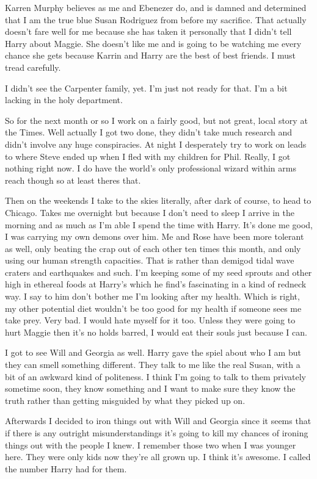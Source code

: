 Karren Murphy believes as me and Ebenezer do, and is damned and determined that I am the true blue Susan Rodriguez from before my sacrifice. That actually doesn't fare well for me because she has taken it personally that I didn't tell Harry about Maggie. She doesn't like me and is going to be watching me every chance she gets because Karrin and Harry are the best of best friends. I must tread carefully.

I didn't see the Carpenter family, yet. I'm just not ready for that. I'm a bit lacking in the holy department.

So for the next month or so I work on a fairly good, but not great, local story at the Times. Well actually I got two done, they didn't take much research and didn't involve any huge conspiracies. At night I desperately try to work on leads to where Steve ended up when I fled with my children for Phil. Really, I got nothing right now. I do have the world's only professional wizard within arms reach though so at least theres that.

Then on the weekends I take to the skies literally, after dark of course, to head to Chicago. Takes me overnight but because I don't need to sleep I arrive in the morning and as much as I'm able I spend the time with Harry. It's done me good, I was carrying my own demons over him. Me and Rose have been more tolerant as well, only beating the crap out of each other ten times this month, and only using our human strength capacities. That is rather than demigod tidal wave craters and earthquakes and such. I'm keeping some of my seed sprouts and other high in ethereal foods at Harry's which he find's fascinating in a kind of redneck way. I say to him don't bother me I'm looking after my health. Which is right, my other potential diet wouldn't be too good for my health if someone sees me take prey. Very bad. I would hate myself for it too. Unless they were going to hurt Maggie then it's no holds barred, I would eat their souls just because I can.

I got to see Will and Georgia as well. Harry gave the spiel about who I am but they can smell something different. They talk to me like the real Susan, with a bit of an awkward kind of politeness. I think I'm going to talk to them privately sometime soon, they know something and I want to make sure they know the truth rather than getting misguided by what they picked up on.

Afterwards I decided to iron things out with Will and Georgia since it seems that if there is any outright misunderstandings it's going to kill my chances of ironing things out with the people I knew. I remember those two when I was younger here. They were only kids now they're all grown up. I think it's awesome. I called the number Harry had for them.

